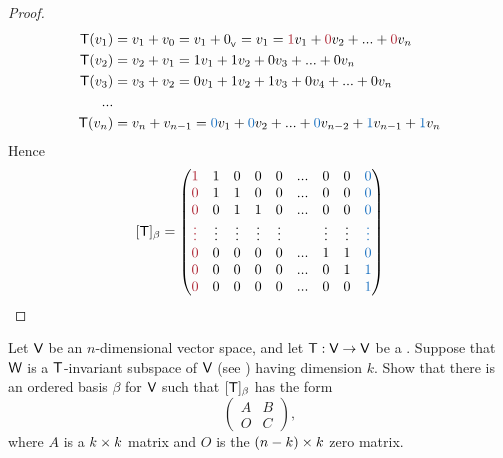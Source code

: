 \begin{proof}
\begin{align*}
    \T(v_1) & = v_1 + v_0 = v_1 + \OV = v_1 = \MAROON{1} v_1 + \MAROON{0} v_2 + ... + \MAROON{0} v_n \\
    \T(v_2) & = v_2 + v_1 = 1 v_1 + 1 v_2 + 0 v_3 + ... + 0 v_n \\
    \T(v_3) & = v_3 + v_2 = 0 v_1 + 1 v_2 + 1 v_3 + 0 v_4 + ... + 0 v_n \\
    ... \\
    \T(v_n) & = v_n + v_{n - 1} = \BLUE{0} v_1 + \BLUE{0} v_2 + ... + \BLUE{0} v_{n - 2} + \BLUE{1} v_{n - 1} + \BLUE{1} v_n \\
\end{align*}
Hence
\[
    [\T]_{\beta} = \begin{pmatrix}
        \MAROON{1} & 1 & 0 & 0 & 0 & ... & 0 & 0 & \BLUE{0}\\
        \MAROON{0} & 1 & 1 & 0 & 0 & ... & 0 & 0 & \BLUE{0} \\
        \MAROON{0} & 0 & 1 & 1 & 0 & ... & 0 & 0 & \BLUE{0} \\
        \MAROON{\vdots} & \vdots & \vdots & \vdots & \vdots & & \vdots & \vdots & \BLUE{\vdots} \\
        \MAROON{0} & 0 & 0 & 0 & 0 & ... & 1 & 1 & \BLUE{0} \\
        \MAROON{0} & 0 & 0 & 0 & 0 & ... & 0 & 1 & \BLUE{1} \\
        \MAROON{0} & 0 & 0 & 0 & 0 & ... & 0 & 0 & \BLUE{1}
    \end{pmatrix}
\]
\end{proof}

\begin{exercise} \label{exercise 2.2.11}
Let \(\textsf{V}\) be an \(n\)-dimensional vector space, and let \(\textsf{T} : \textsf{V} \to \textsf{V}\) be a \LTRAN{}.
Suppose that \(\textsf{W}\) is a \(\textsf{T}\)-invariant subspace of \(\textsf{V}\) (see ) having dimension \(k\).
Show that there is an ordered basis \(\beta\) for \(\textsf{V}\) such that \([\textsf{T}]_{\beta}\) has the form
\[
    \begin{pmatrix} A & B \\ O & C \end{pmatrix},
\]
where \(A\) is a \(k \times k\) matrix and \(O\) is the \((n - k) \times k\) zero matrix.
\end{exercise}

